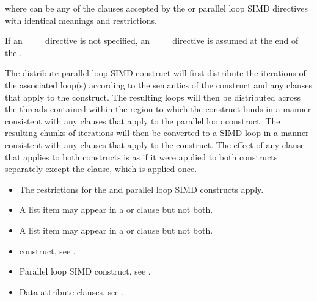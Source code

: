 where  can be any of the clauses accepted by the  or parallel loop 
SIMD directives with identical meanings and restrictions.

If an ~~~~ directive is not specified, an 
~~~~ directive is assumed at the end of the .
\fortranspecificend

\descr
The distribute parallel loop SIMD construct will first distribute the iterations of the 
associated loop(s) according to the semantics of the  construct and any 
clauses that apply to the  construct. The resulting loops will then be 
distributed across the threads contained within the  region to which the
 construct binds in a manner consistent with any clauses that apply to the 
parallel loop construct. The resulting chunks of iterations will then be converted to a 
SIMD loop in a manner consistent with any clauses that apply to the  construct. 
The effect of any clause that applies to both constructs is as if it were applied to both constructs separately except the  clause, which is applied once.


\restrictions
\begin{itemize}
\item The restrictions for the  and parallel loop SIMD constructs apply.
\item A list item may appear in a  or  clause but not both.
\item A list item may appear in a  or  clause but not both.
\end{itemize}

\crossreferences
\begin{itemize}
\item {} construct, see 
.

\item Parallel loop SIMD construct, see 
.

\item Data attribute clauses, see .
\end{itemize}


